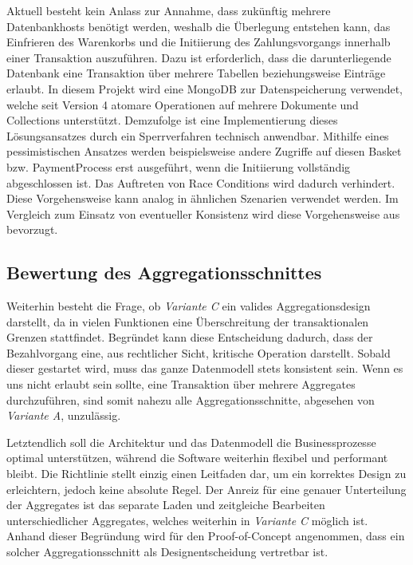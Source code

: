 Aktuell besteht kein Anlass zur Annahme, dass zukünftig mehrere Datenbankhosts benötigt werden, weshalb die Überlegung entstehen kann, das Einfrieren des Warenkorbs und die Initiierung des Zahlungsvorgangs innerhalb einer Transaktion auszuführen. Dazu ist erforderlich, dass die darunterliegende Datenbank eine Transaktion über mehrere Tabellen beziehungsweise Einträge erlaubt. In diesem Projekt wird eine MongoDB zur Datenspeicherung verwendet, welche seit Version 4 atomare Operationen auf mehrere Dokumente und Collections unterstützt. Demzufolge ist eine Implementierung dieses Lösungsansatzes durch ein Sperrverfahren technisch anwendbar. Mithilfe eines pessimistischen Ansatzes werden beispielsweise andere Zugriffe auf diesen Basket bzw. PaymentProcess erst ausgeführt, wenn die Initiierung vollständig abgeschlossen ist. Das Auftreten von Race Conditions wird dadurch verhindert. Diese Vorgehensweise kann analog in ähnlichen Szenarien verwendet werden. Im Vergleich zum Einsatz von eventueller Konsistenz wird diese Vorgehensweise aus bevorzugt.

\subsection{Bewertung des Aggregationsschnittes}

Weiterhin besteht die Frage, ob \emph{Variante C} ein valides Aggregationsdesign darstellt, da in vielen Funktionen eine Überschreitung der transaktionalen Grenzen stattfindet. Begründet kann diese Entscheidung dadurch, dass der Bezahlvorgang eine, aus rechtlicher Sicht, kritische Operation darstellt. Sobald dieser gestartet wird, muss das ganze Datenmodell stets konsistent sein. Wenn es uns nicht erlaubt sein sollte, eine Transaktion über mehrere Aggregates durchzuführen, sind somit nahezu alle Aggregationsschnitte, abgesehen von \emph{Variante A}, unzulässig. 

Letztendlich soll die Architektur und das Datenmodell die Businessprozesse optimal unterstützen, während die Software weiterhin flexibel und performant bleibt. Die Richtlinie stellt einzig einen Leitfaden dar, um ein korrektes Design zu erleichtern, jedoch keine absolute Regel. Der Anreiz für eine genauer Unterteilung der Aggregates ist das separate Laden und zeitgleiche Bearbeiten unterschiedlicher Aggregates, welches weiterhin in \emph{Variante C} möglich ist. Anhand dieser Begründung wird für den Proof-of-Concept angenommen, dass ein solcher Aggregationsschnitt als Designentscheidung vertretbar ist. 

